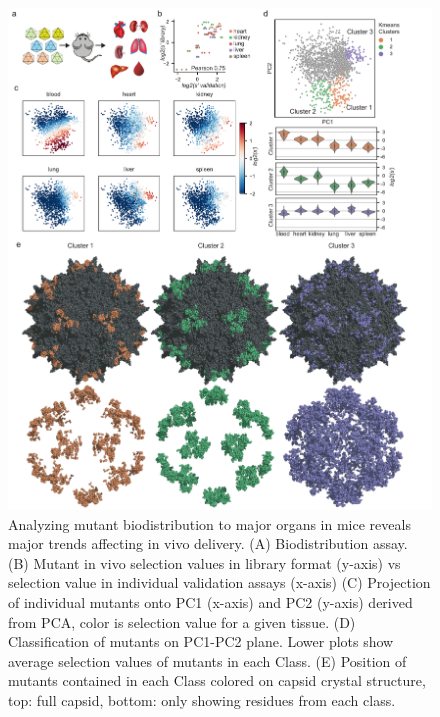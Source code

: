 \begin{figure}
\includegraphics[width=1\linewidth]{figures/20190604_AAV2_fig3_mouse_PO_working_v4.pdf}
\caption[Analyzing mutant biodistribution to major organs in mice reveals major trends affecting in vivo delivery.]{Analyzing mutant biodistribution to major organs in mice reveals major trends affecting in vivo delivery. (A) Biodistribution assay. (B) Mutant in vivo selection values in library format (y-axis) vs selection value in individual validation assays (x-axis) (C) Projection of individual mutants onto PC1 (x-axis) and PC2 (y-axis) derived from PCA, color is selection value for a given tissue. (D) Classification of mutants on PC1-PC2 plane. Lower plots show average selection values of mutants in each Class. (E) Position of mutants contained in each Class colored on capsid crystal structure, top: full capsid, bottom: only showing residues from each class.
\label{fig:Figure 4}}
\end{figure}

